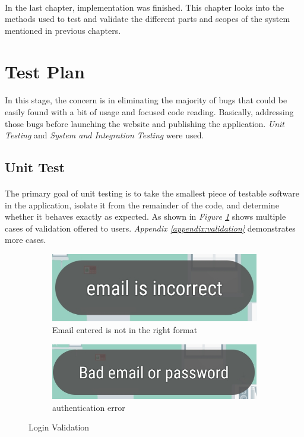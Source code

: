 \documentclass[12pt, oneside, a4paper]{book}
\begin{document}
		\paragraph{}In the last chapter, implementation was finished. This chapter looks into the methods used to test and validate the different parts and scopes of the system mentioned in previous chapters.
		\section{Test Plan}
		\paragraph{}In this stage, the concern is in eliminating the majority of bugs that could be easily found with a bit of usage and focused code reading. Basically, addressing those bugs before launching the website and publishing the application. \textit{Unit Testing} and \textit{System and Integration Testing} were used.
			\subsection{Unit Test}
			\paragraph{}The primary goal of unit testing is to take the smallest piece of testable software in the application, isolate it from the remainder of the code, and determine whether it behaves exactly as expected. As shown in \textit{Figure \ref{fig:test_example}} shows multiple cases of validation offered to users. \textit{Appendix \ref{appendix:validation}} demonstrates more cases. 
			\begin{figure}[H]
				\begin{subfigure}[b]{.5\linewidth}
					\includegraphics[width=\linewidth]{img/output_validation_email_not_valid.jpg}
					\caption{Email entered is not in the right format}
				\end{subfigure}
				\begin{subfigure}[b]{.5\linewidth}
					\includegraphics[width=\linewidth]{img/output_validation_email_pass_wrong.jpg}
					\caption{authentication error}
				\end{subfigure}
				\caption{Login Validation}
				\label{fig:test_example}
			\end{figure}
\end{document}
